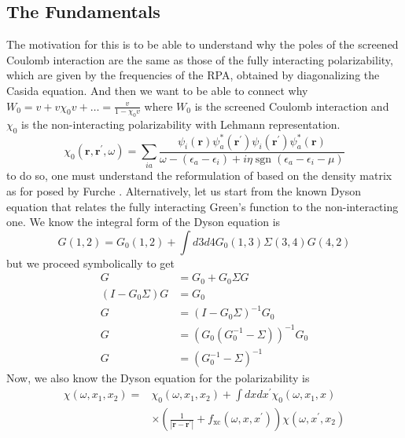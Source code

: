 \subsection{The Fundamentals}
The motivation for this is to be able to understand why the poles of the screened Coulomb interaction are the same as those of the fully interacting polarizability, which are given by the frequencies of the RPA, obtained by diagonalizing the Casida equation. And then we want to be able to connect why $W_0 = v + v\chi_0 v + \ldots = \frac{v}{1-\chi_0 v}$ where $W_0$ is the screened Coulomb interaction and $\chi_0$ is the non-interacting polarizability with Lehmann representation. 
\begin{equation}
    \chi_{0}\left(\mathbf{r}, \mathbf{r}^{\prime}, \omega\right)=\sum_{ia}\frac{\psi_{i}(\mathbf{r}) \psi_{a}^{*}(\mathbf{r}^{\prime}) \psi_{i}(\mathbf{r}^{\prime}) \psi_{a}^{*}(\mathbf{r})}{\omega-\left(\epsilon_{a}-\epsilon_{i}\right)+i \eta \operatorname{sgn}\left(\epsilon_{a}-\epsilon_{i} - \mu\right)}
\end{equation}
to do so, one must understand the reformulation of based on the density matrix as for posed by Furche \cite{furche2001density}.
Alternatively, let us start from the known Dyson equation that relates the fully interacting Green's function to the non-interacting one. We know the integral form of the Dyson equation is
\begin{equation}
    G(1,2) = G_0(1,2) + \int d3 d4 G_0(1,3) \Sigma(3,4) G(4,2)
\end{equation}
but we proceed symbolically to get
\begin{align}
    G &= G_0 + G_0 \Sigma G \\
    \left(I - G_0 \Sigma\right) G &= G_0 \\
    G &= \left(I - G_0 \Sigma\right)^{-1} G_0 \\
    G &= \left(G_0\left(G_0^{-1} - \Sigma \right)\right)^{-1} G_0 \\
    G &= \left(G_0^{-1} - \Sigma \right)^{-1}
\end{align}
Now, we also know the Dyson equation for the polarizability is
\begin{equation}
    \begin{aligned}
\chi\left(\omega, x_1, x_2\right)= & \chi_0\left(\omega, x_1, x_2\right)+\int d x d x^{\prime} \chi_0\left(\omega, x_1, x\right) \\
& \times\left(\frac{1}{\left|\mathbf{r}-\mathbf{r}^{\prime}\right|}+f_{\mathrm{xc}}\left(\omega, x, x^{\prime}\right)\right) \chi\left(\omega, x^{\prime}, x_2\right)
\end{aligned}
\end{equation}
